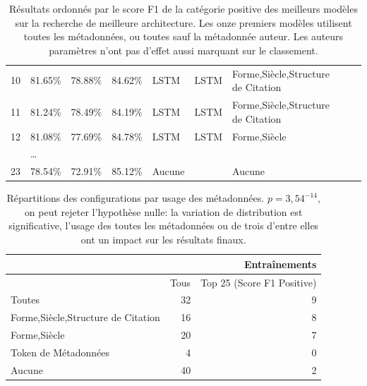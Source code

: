 \begin{table}[ht]
{\begin{tabular}{@{}lllllllll@{}}
10   & 81.65\%            & 78.88\%          & 84.62\%             & LSTM            & LSTM              & Forme,Siècle,Structure de Citation \\
11   & 81.24\%            & 78.49\%          & 84.19\%             & LSTM            & LSTM              & Forme,Siècle,Structure de Citation \\
12   & 81.08\%            & 77.69\%          & 84.78\%             & LSTM            & LSTM              & Forme,Siècle                       \\
     & …                  &                  &                     &                 &                   &                                    \\
23   & 78.54\%            & 72.91\%          & 85.12\%             & Aucune          &                   & Aucune                             \\ \bottomrule
\end{tabular}%
}
\caption{Résultats ordonnés par le score F1 de la catégorie positive des meilleurs modèles sur la recherche de meilleure architecture. Les onze premiers modèles utilisent toutes les métadonnées, ou toutes sauf la métadonnée auteur. Les auteurs paramètres n'ont pas d'effet aussi marquant sur le classement.}
\label{tab:chap4:resultats-metadata}
\end{table}

\begin{table}[ht]
\centering
\begin{tabular}{l|r|r}
                                   & \multicolumn{2}{r}{Entraînements} \\ \hline
                                   & Tous & Top 25 (Score F1 Positive) \\ \hline
Toutes                             & 32   & 9                          \\
Forme,Siècle,Structure de Citation & 16   & 8                          \\
Forme,Siècle                       & 20   & 7                          \\
Token de Métadonnées               & 4    & 0                          \\
Aucune                             & 40   & 2                          \\ \hline
\end{tabular}
\caption{Répartitions des configurations par usage des métadonnées. $p=3,54^{-14}$, on peut rejeter l'hypothèse nulle: la variation de distribution est significative, l'usage des toutes les métadonnées ou de trois d'entre elles ont un impact sur les résultats finaux.}
\label{tab:chap4:metadata-p-value}
\end{table}

